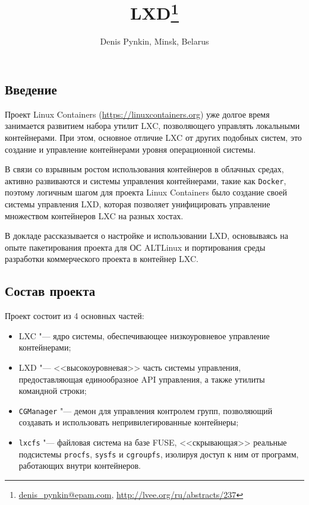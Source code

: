 \documentclass[10pt, a5paper]{article}
\title{LXD\footnote{\url{denis_pynkin@epam.com}, \url{http://lvee.org/ru/abstracts/237}}}
\author{Denis Pynkin, Minsk, Belarus}
\begin{document}
\maketitle

\begin{abstract}

\end{abstract}

\subsection*{Введение}

Проект Linux Containers (\url{https://linuxcontainers.org}) уже долгое время занимается развитием набора утилит LXC, позволяющего управлять 
локальными контейнерами. При этом, основное отличие LXC от других подобных 
систем, это создание и управление контейнерами уровня операционной системы.

В связи со взрывным ростом использования контейнеров в облачных средах,
активно развиваются и системы управления контейнерами, такие как 
{\tt Docker}, поэтому логичным шагом для проекта Linux Containers было
создание своей системы управления LXD, которая позволяет унифицировать 
управление множеством контейнеров LXC на разных хостах.

В докладе рассказывается о настройке и использовании LXD, основываясь на опыте
пакетирования проекта для ОС ALTLinux и портирования среды разработки 
коммерческого проекта в контейнер LXC.

\subsection*{Состав проекта}

Проект состоит из 4 основных частей:
\begin{itemize}
    \item {LXC} "--- ядро системы, обеспечивающее низкоуровневое управление 
    контейнерами;
    \item {LXD} "--- <<высокоуровневая>> часть системы управления, предоставляющая
    единообразное API управления, а также утилиты командной строки;
    \item {\tt CGManager} "--- демон для управления контролем групп, позволяющий 
    создавать и использовать непривилегированные контейнеры;
    \item {\tt lxcfs} "--- файловая система на базе FUSE, <<скрывающая>> реальные 
    подсистемы {\tt procfs}, {\tt sysfs} и {\tt cgroupfs}, изолируя доступ к ним 
    от программ,  работающих внутри контейнеров.
\end{itemize}
\end{document}
